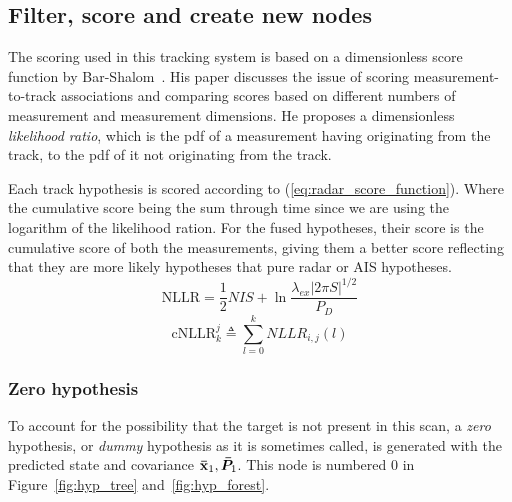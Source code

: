 \subsection{Filter, score and create new nodes}
The scoring used in this tracking system is based on a dimensionless score function by Bar-Shalom~\cite{Bar-Shalom2007}. His paper discusses the issue of scoring measurement-to-track associations and comparing scores based on different numbers of measurement and measurement dimensions. He proposes a dimensionless \emph{likelihood ratio}, which is the \gls{pdf} of a measurement having originating from the track, to the \gls{pdf} of it not originating from the track.

Each \gls{track hypothesis} is scored according to (\ref{eq:radar_score_function}). Where the cumulative score being the sum through time since we are using the logarithm of the likelihood ration. For the fused hypotheses, their score is the cumulative score of both the measurements, giving them a better score reflecting that they are more likely hypotheses that pure radar or AIS hypotheses. 
\begin{equation}\label{eq:radar_score_function}
\mathrm{NLLR} = \frac{1}{2} NIS + \ln \frac{\lambda_{ex} |2 \pi S|^{1/2}} {P_D}		
\end{equation}
\begin{equation}
\mathrm{cNLLR}_k^j \triangleq \sum_{l=0}^k NLLR_{i,j}(l)
\end{equation}

\subsubsection{Zero hypothesis}
To account for the possibility that the target is not present in this scan, a \emph{zero} hypothesis, or \emph{dummy} hypothesis as it is sometimes called, is generated with the predicted state and covariance \(\boldsymbol{\mathbf{\bar{x}}}_1, \bm{\bar{P}}_1\). This node is numbered 0 in Figure~\ref{fig:hyp_tree} and~\ref{fig:hyp_forest}.

